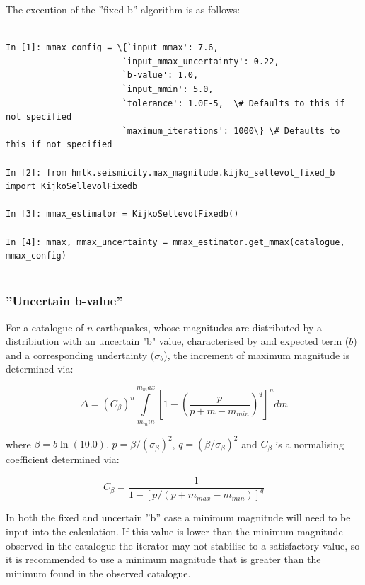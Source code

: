The execution of the \cite{Kijko2004} ''fixed-b'' algorithm is as follows:

\begin{Verbatim}[frame=single, commandchars=\\\{\}, fontsize=\scriptsize]

In [1]: mmax_config = \{`input_mmax': 7.6,
                       `input_mmax_uncertainty': 0.22,
                       `b-value': 1.0,
                       `input_mmin': 5.0,
                       `tolerance': 1.0E-5,  \# Defaults to this if not specified
                       `maximum_iterations': 1000\} \# Defaults to this if not specified
                       
In [2]: from hmtk.seismicity.max_magnitude.kijko_sellevol_fixed_b import KijkoSellevolFixedb

In [3]: mmax_estimator = KijkoSellevolFixedb()

In [4]: mmax, mmax_uncertainty = mmax_estimator.get_mmax(catalogue, mmax_config)
                
\end{Verbatim}

\subsubsection{''Uncertain b-value''}

For a catalogue of $n$ earthquakes, whose magnitudes are distributed by a \cite{GutenbergRichter1944} distribiution with an uncertain "b" value, characterised by and expected term ($b$) and a corresponding undertainty ($\sigma_b$), the increment of maximum magnitude is determined via:


\begin{equation}
\Delta = \left( {C_{\beta}} \right)^n \int\limits_{m_min}^{m_max} \left[ {1 - \left( {\frac{p}{p + m - m_{min}}} \right) ^q} \right]^n dm
\end{equation}

where $\beta = b \ln \left( {10.0} \right)$, $p = \beta / \left( {\sigma_{\beta}} \right) ^ 2$, $q = \left( {\beta / \sigma_{\beta}} \right) ^ 2$ and $C_{\beta}$ is a normalising coefficient determined via:

\begin{equation}
C_{\beta} = \frac{1}{1 - \left[ {p / \left( {p + m_{max} - m_{min}} \right) } \right]^q}
\end{equation}

In both the fixed and uncertain ''b'' case a minimum magnitude will need to be input into the calculation. If this value is lower than the minimum magnitude observed in the catalogue the iterator may not stabilise to a satisfactory value, so it is recommended to use a minimum magnitude that is greater than the minimum found in the observed catalogue.

